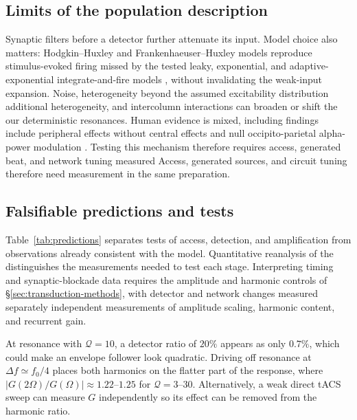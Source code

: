 \documentclass[11pt,a4paper]{article}
\providecommand{\DIFaddtex}[1]{{\protect\color{blue} \sf #1}} %
\providecommand{\DIFdeltex}[1]{{\protect\color{red} \scriptsize #1}} %
\providecommand{\DIFaddbegin}{} %
\providecommand{\DIFaddend}{} %
\providecommand{\DIFdelbegin}{} %
\providecommand{\DIFdelend}{} %
\providecommand{\DIFadd}[1]{\texorpdfstring{\DIFaddtex{#1}}{#1}} %
\providecommand{\DIFdel}[1]{\texorpdfstring{\DIFdeltex{#1}}{}} %
\begin{document}
\subsection{\DIFadd{Limits of the population description}}
\DIFadd{Synaptic filters before a detector further attenuate its input. Model choice
also matters}\DIFaddend : Hodgkin--Huxley and Frankenhaeuser--Huxley models reproduce
stimulus-evoked firing missed by the tested leaky, exponential, and
adaptive-exponential integrate-and-fire models \cite{plovie2025}\DIFdelbegin \DIFdel{, without invalidating the weak-input expansion}\DIFdelend .
Noise, \DIFdelbegin \DIFdel{heterogeneity beyond the assumed excitability distribution}\DIFdelend \DIFaddbegin \DIFadd{additional heterogeneity}\DIFaddend , and intercolumn interactions can broaden or
shift \DIFdelbegin \DIFdel{the }\DIFdelend \DIFaddbegin \DIFadd{our }\DIFaddend deterministic resonances. Human \DIFdelbegin \DIFdel{evidence
is mixed, including }\DIFdelend \DIFaddbegin \DIFadd{findings include }\DIFaddend peripheral effects
without central effects \cite{iszak2023} and null occipito-parietal alpha-power
modulation \cite{mansourinezhad2025}. \DIFdelbegin \DIFdel{Testing this mechanism therefore requires access, generated beat, and network
tuning measured }\DIFdelend \DIFaddbegin \DIFadd{Access, generated sources, and circuit
tuning therefore need measurement }\DIFaddend in the same preparation.

\subsection{Falsifiable predictions and tests}\label{sec:predictions}
Table~\ref{tab:predictions} \DIFdelbegin \DIFdel{separates tests of access, detection, and amplification
from observations already consistent with the model. Quantitative reanalysis of
the }\DIFdelend \DIFaddbegin \DIFadd{distinguishes the measurements needed to test each
stage. Interpreting }\DIFaddend timing and synaptic-blockade data requires \DIFdelbegin \DIFdel{the amplitude and harmonic controls
of \S\ref{sec:transduction-methods}, with detector and network changes measured
separately}\DIFdelend \DIFaddbegin \DIFadd{independent
measurements of amplitude scaling, harmonic content, and recurrent gain}\DIFaddend .

\DIFdelbegin %
\DIFdelend \DIFaddbegin \DIFadd{At resonance with $\mathcal Q=10$, a detector ratio of $20\%$ appears as only $0.7\%$,
which could make an envelope follower look quadratic. Driving off resonance
at $\Delta f\simeq f_0/4$ places both harmonics on the flatter part of the
response, where $|G(2\Omega)/G(\Omega)|\approx1.22$--$1.25$ for
$\mathcal Q=3$--$30$. Alternatively, a weak direct tACS sweep can measure
$G$ independently so its effect can be removed from the harmonic ratio.
}
\end{document}
